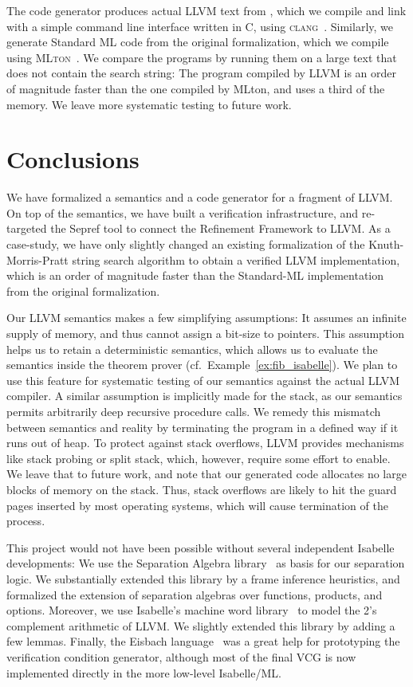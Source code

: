 \documentclass[a4paper,oribibl,envcountsame]{llncs}
\begin{document}
The code generator produces actual LLVM text from , which we compile and link with a simple command line interface written in C, 
using \textsc{clang}~\cite{Clang}.
Similarly, we generate Standard ML code from the original formalization, which we compile using \textsc{MLton}~\cite{MLton}.
We compare the programs by running them on a large text that does not contain the search string: 
The program compiled by LLVM is an order of magnitude faster than the one compiled by MLton, and uses a third of the memory.
We leave more systematic testing to future work.




\section{Conclusions}
We have formalized a semantics and a code generator for a fragment of LLVM. On top of the semantics, we have built a verification 
infrastructure, and re-targeted the Sepref tool to connect the Refinement Framework to LLVM. As a case-study, we have 
only slightly changed an existing formalization of the Knuth-Morris-Pratt string search algorithm to obtain a verified LLVM implementation,
which is an order of magnitude faster than the Standard-ML implementation from the original formalization.

Our LLVM semantics makes a few simplifying assumptions: It assumes an infinite supply of memory, and thus cannot assign a bit-size to pointers. 
This assumption helps us to retain a deterministic semantics, which allows us to evaluate the semantics inside the theorem prover (cf.~Example~\ref{ex:fib_isabelle}). 
We plan to use this feature for systematic testing of our semantics against the actual LLVM compiler. 
A similar assumption is implicitly made for the stack, as our semantics permits arbitrarily deep recursive procedure calls.
We remedy this mismatch between semantics and reality by terminating the program in a defined way if it runs out of heap.
To protect against stack overflows, LLVM provides mechanisms like stack probing or split stack, which, however, require some effort to enable. 
We leave that to future work, and note that our generated code allocates no large blocks of memory on the stack. 
Thus, stack overflows are likely to hit the guard pages inserted by most operating systems, which will cause termination of the process.

This project would not have been possible without several independent Isabelle developments:
We use the Separation Algebra library~\cite{KKB12_afp,KKB12} as basis for our separation logic. We substantially extended this library by a 
frame inference heuristics, and formalized the extension of separation algebras over functions, products, and options. 
Moreover, we use Isabelle's machine word library~\cite{Word_Lib-AFP} to model the 2's complement arithmetic of LLVM. We slightly extended this library by adding a few lemmas. Finally, the Eisbach language~\cite{MMW16} was a great help for prototyping the verification condition generator, although most of the 
final VCG is now implemented directly in the more low-level Isabelle/ML.
\end{document}
